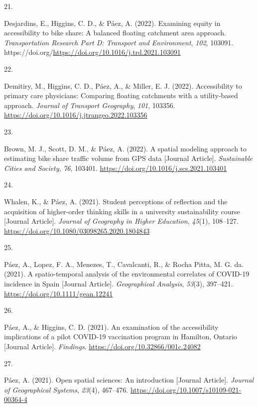 \documentclass[11pt,a4paper,]{awesome-cv}
\newlength{\cslhangindent}
\newlength{\csllabelwidth}
\newenvironment{CSLReferences}[2] %
 {\begin{list}{}{%
  \setlength{\itemindent}{0pt}
  \setlength{\leftmargin}{0pt}
  \setlength{\parsep}{0pt}
  \ifodd #1
   \setlength{\leftmargin}{\cslhangindent}
   \setlength{\itemindent}{-1\cslhangindent}
  \fi
  \setlength{\itemsep}{#2\baselineskip}}}
 {\end{list}}
\newcommand{\CSLLeftMargin}[1]{\parbox[t]{\csllabelwidth}{\strut#1\strut}}
\newcommand{\CSLRightInline}[1]{\parbox[t]{\linewidth - \csllabelwidth}{\strut#1\strut}}
\begin{document}
\begin{CSLReferences}{0}{0}
\CSLLeftMargin{21. }%
\CSLRightInline{Desjardins, E., Higgins, C. D., \& Páez, A. (2022).
Examining equity in accessibility to bike share: A balanced floating
catchment area approach. \emph{Transportation Research Part D: Transport
and Environment}, \emph{102}, 103091.
https://doi.org/\url{https://doi.org/10.1016/j.trd.2021.103091}}

\CSLLeftMargin{22. }%
\CSLRightInline{Demitiry, M., Higgins, C. D., Páez, A., \& Miller, E. J.
(2022). Accessibility to primary care physicians: Comparing floating
catchments with a utility-based approach. \emph{Journal of Transport
Geography}, \emph{101}, 103356.
\url{https://doi.org/10.1016/j.jtrangeo.2022.103356}}

\CSLLeftMargin{23. }%
\CSLRightInline{Brown, M. J., Scott, D. M., \& Páez, A. (2022). A
spatial modeling approach to estimating bike share traffic volume from
GPS data {[}Journal Article{]}. \emph{Sustainable Cities and Society},
\emph{76}, 103401. \url{https://doi.org/10.1016/j.scs.2021.103401}}

\CSLLeftMargin{24. }%
\CSLRightInline{Whalen, K., \& Páez, A. (2021). Student perceptions of
reflection and the acquisition of higher-order thinking skills in a
university sustainability course {[}Journal Article{]}. \emph{Journal of
Geography in Higher Education}, \emph{45}(1), 108--127.
\url{https://doi.org/10.1080/03098265.2020.1804843}}

\CSLLeftMargin{25. }%
\CSLRightInline{Páez, A., Lopez, F. A., Menezes, T., Cavalcanti, R., \&
Rocha Pitta, M. G. da. (2021). A spatio-temporal analysis of the
environmental correlates of COVID-19 incidence in Spain {[}Journal
Article{]}. \emph{Geographical Analysis}, \emph{53}(3), 397--421.
\url{https://doi.org/10.1111/gean.12241}}

\CSLLeftMargin{26. }%
\CSLRightInline{Páez, A., \& Higgins, C. D. (2021). An examination of
the accessibility implications of a pilot COVID-19 vaccination program
in Hamilton, Ontario {[}Journal Article{]}. \emph{Findings}.
\url{https://doi.org/10.32866/001c.24082}}

\CSLLeftMargin{27. }%
\CSLRightInline{Páez, A. (2021). Open spatial sciences: An introduction
{[}Journal Article{]}. \emph{Journal of Geographical Systems},
\emph{23}(4), 467--476.
\url{https://doi.org/10.1007/s10109-021-00364-4}}


\end{CSLReferences}
\end{document}
